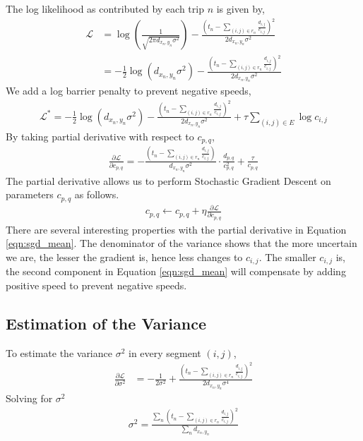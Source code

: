 \documentclass{sig-alternate}
\begin{document}
The log likelihood as contributed by each trip $n$ is given by, 
\begin{align}
	\mathcal{L} &= \log \left( \frac{1}{\sqrt{2 \pi d_{x_n, y_n} \sigma^2 }} \right) - \frac{\left( t_n - \sum_{ (i,j) \in r_n } \frac{d_{i,j}}{c_{i,j}} \right)^2}{2 d_{x_n, y_n} \sigma^2 } \nonumber \\
	&= - \frac{1}{2} \log \left( d_{x_n, y_n} \sigma^2 \right) - \frac{\left( t_n - \sum_{ (i,j) \in r_n } \frac{d_{i,j}}{c_{i,j}} \right)^2}{2 d_{x_n, y_n} \sigma^2 }
\end{align}
We add a log barrier penalty to prevent negative speeds, 
\begin{align}
	\mathcal{L^*} = - \frac{1}{2} \log \left( d_{x_n, y_n} \sigma^2 \right) - \frac{\left( t_n - \sum_{ (i,j) \in r_n } \frac{d_{i,j}}{c_{i,j}} \right)^2}{2 d_{x_n, y_n} \sigma^2 } + \tau \sum_{(i,j) \in E} \log c_{i,j}
\end{align}
By taking partial derivative with respect to $c_{p,q}$,
\begin{align}
	\label{eqn:sgd_mean}
	\frac{\partial \mathcal{L}}{\partial c_{p,q}} = - \frac{\left( t_n - \sum_{ (i,j) \in r_n } \frac{d_{i,j}}{c_{i,j}} \right)}{d_{x_n, y_n} \sigma^2 } \cdot \frac{d_{p,q}}{c_{p,q}^2} + \frac{\tau}{c_{p,q}}
\end{align}
The partial derivative allows us to perform Stochastic Gradient Descent on parameters $c_{p,q}$ as follows.
\begin{align}
	c_{p,q} \leftarrow c_{p,q} + \eta \frac{\partial \mathcal{L}}{\partial c_{p,q}}
\end{align}
There are several interesting properties with the partial derivative in Equation \ref{eqn:sgd_mean}. The denominator of the variance shows that the more uncertain we are, the lesser the gradient is, hence less changes to $c_{i,j}$. The smaller $c_{i,j}$ is, the second component in Equation \ref{eqn:sgd_mean} will compensate by adding positive speed to prevent negative speeds.

\subsection{Estimation of the Variance}

To estimate the variance $\sigma^2$ in every segment $(i,j)$, 
\begin{align}
	\frac{\partial \mathcal{L}}{\partial \sigma^2} &= - \frac{1}{ 2 \sigma^2 } + \frac{ \left( t_n - \sum_{ (i,j) \in r_n } \frac{d_{i,j}}{c_{i,j}} \right)^2}{ 2 d_{x_n, y_n} \sigma^4 }
\end{align}
Solving for $\sigma^2$
\begin{align}
	\sigma^2 = \frac{ \sum_n \left( t_n - \sum_{ (i,j) \in r_n } \frac{d_{i,j}}{c_{i,j}} \right)^2}{\sum_n d_{x_n, y_n}}
\end{align}
\end{document}
